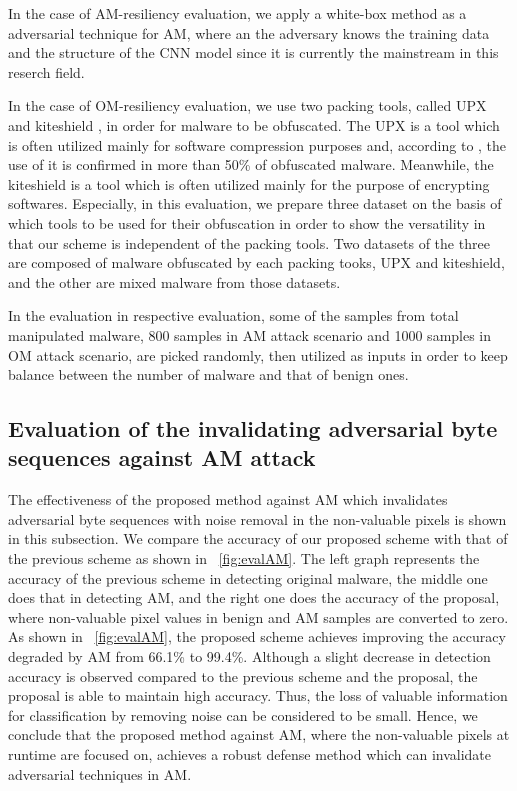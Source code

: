 \documentclass{ieeeaccess}
\begin{document}
In the case of AM-resiliency evaluation, we apply a white-box method as a adversarial technique for AM, where an the adversary knows the training data and the structure of the CNN model since it is currently the mainstream in this reserch field.

In the case of OM-resiliency evaluation, we use two packing tools, called UPX \cite{upx} and kiteshield \cite{kiteshield}, in order for malware to be obfuscated.
The UPX is a tool which is often utilized mainly for software compression purposes and, according to \cite{pack_research}, the use of it is confirmed in more than 50\% of obfuscated malware. 
Meanwhile, the kiteshield is a tool which is often utilized mainly for the purpose of encrypting softwares.
Especially, in this evaluation, we prepare three dataset on the basis of which tools to be used for their obfuscation in order to show the versatility in that our scheme is independent of the packing tools.
Two datasets of the three are composed of malware obfuscated by each packing tooks, UPX and kiteshield, and the other are mixed malware from those datasets. 

In the evaluation in respective evaluation, some of the samples from total manipulated malware, 800 samples in AM attack scenario and 1000 samples in OM attack scenario, are picked randomly, then utilized as inputs in order to keep balance between the number of malware and that of benign ones.

\subsection{Evaluation of the invalidating adversarial byte sequences against AM attack}
The effectiveness of the proposed method against AM which invalidates adversarial byte sequences with noise removal in the non-valuable pixels is shown in this subsection.
We compare the accuracy of our proposed scheme with that of the previous scheme as shown in \figurename~\ref{fig:evalAM}.
The left graph represents the accuracy of the previous scheme in detecting original malware, the middle one does that in detecting AM, and the right one does the accuracy of the proposal, where non-valuable pixel values in benign and AM samples are converted to zero.
As shown in \figurename~\ref{fig:evalAM}, the proposed scheme achieves improving the accuracy degraded by AM from 66.1\% to 99.4\%.
Although a slight decrease in detection accuracy is observed compared to the previous scheme and the proposal, the proposal is able to maintain high accuracy.
Thus, the loss of valuable information for classification by removing noise can be considered to be small.
Hence, we conclude that the proposed method against AM, where the non-valuable pixels at runtime are focused on, achieves a robust defense method which can invalidate adversarial techniques in AM.
\end{document}
